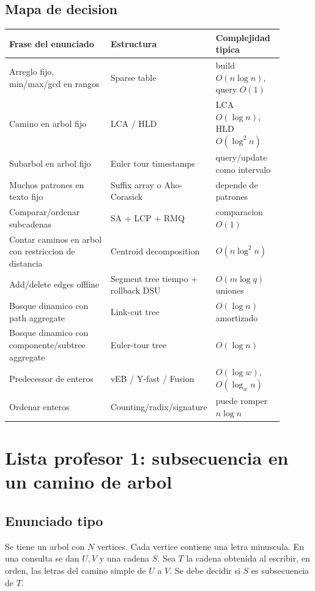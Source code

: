 \documentclass[10pt]{article}
\newcommand{\bigO}{O}
\begin{document}
\subsection{Mapa de decision}
\begin{center}
\begin{tabular}{p{0.38\linewidth}p{0.26\linewidth}p{0.25\linewidth}}
\toprule
Frase del enunciado & Estructura & Complejidad tipica \\
\midrule
Arreglo fijo, min/max/gcd en rangos & Sparse table & build \(\bigO(n\log n)\), query \(\bigO(1)\) \\
Camino en arbol fijo & LCA / HLD & LCA \(\bigO(\log n)\), HLD \(\bigO(\log^2 n)\) \\
Subarbol en arbol fijo & Euler tour timestamps & query/update como intervalo \\
Muchos patrones en texto fijo & Suffix array o Aho-Corasick & depende de patrones \\
Comparar/ordenar subcadenas & SA + LCP + RMQ & comparacion \(\bigO(1)\) \\
Contar caminos en arbol con restriccion de distancia & Centroid decomposition & \(\bigO(n\log^2 n)\) \\
Add/delete edges offline & Segment tree tiempo + rollback DSU & \(\bigO(m\log q)\) uniones \\
Bosque dinamico con path aggregate & Link-cut tree & \(\bigO(\log n)\) amortizado \\
Bosque dinamico con componente/subtree aggregate & Euler-tour tree & \(\bigO(\log n)\) \\
Predecessor de enteros & vEB / Y-fast / Fusion & \(\bigO(\log w)\), \(\bigO(\log_w n)\) \\
Ordenar enteros & Counting/radix/signature & puede romper \(n\log n\) \\
\bottomrule
\end{tabular}
\end{center}

\newpage

\section{Lista profesor 1: subsecuencia en un camino de arbol}

\subsection{Enunciado tipo}
Se tiene un arbol con \(N\) vertices. Cada vertice contiene una letra minuscula. En una consulta se dan
\(U,V\) y una cadena \(S\). Sea \(T\) la cadena obtenida al escribir, en orden, las letras del camino simple
de \(U\) a \(V\). Se debe decidir si \(S\) es subsecuencia de \(T\).
\end{document}
